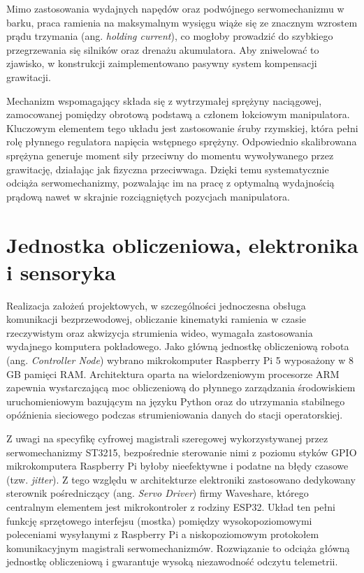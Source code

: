 \documentclass[11pt]{extreport}
\begin{document}
Mimo zastosowania wydajnych napędów oraz podwójnego serwomechanizmu w barku, praca ramienia na maksymalnym wysięgu wiąże się ze znacznym wzrostem prądu trzymania (ang. \textit{holding current}), co mogłoby prowadzić do szybkiego przegrzewania się silników oraz drenażu akumulatora. Aby zniwelować to zjawisko, w konstrukcji zaimplementowano pasywny system kompensacji grawitacji. 

Mechanizm wspomagający składa się z wytrzymałej sprężyny naciągowej, zamocowanej pomiędzy obrotową podstawą a członem łokciowym manipulatora. Kluczowym elementem tego układu jest zastosowanie śruby rzymskiej, która pełni rolę płynnego regulatora napięcia wstępnego sprężyny. Odpowiednio skalibrowana sprężyna generuje moment siły przeciwny do momentu wywoływanego przez grawitację, działając jak fizyczna przeciwwaga. Dzięki temu systematycznie odciąża serwomechanizmy, pozwalając im na pracę z optymalną wydajnością prądową nawet w skrajnie rozciągniętych pozycjach manipulatora.

\section{Jednostka obliczeniowa, elektronika i sensoryka}

Realizacja założeń projektowych, w szczególności jednoczesna obsługa komunikacji bezprzewodowej, obliczanie kinematyki ramienia w czasie rzeczywistym oraz akwizycja strumienia wideo, wymagała zastosowania wydajnego komputera pokładowego. Jako główną jednostkę obliczeniową robota (ang. \textit{Controller Node}) wybrano mikrokomputer Raspberry Pi 5 wyposażony w 8 GB pamięci RAM. Architektura oparta na wielordzeniowym procesorze ARM zapewnia wystarczającą moc obliczeniową do płynnego zarządzania środowiskiem uruchomieniowym bazującym na języku Python oraz do utrzymania stabilnego opóźnienia sieciowego podczas strumieniowania danych do stacji operatorskiej.

Z uwagi na specyfikę cyfrowej magistrali szeregowej wykorzystywanej przez serwomechanizmy ST3215, bezpośrednie sterowanie nimi z poziomu styków GPIO mikrokomputera Raspberry Pi byłoby nieefektywne i podatne na błędy czasowe (tzw. \textit{jitter}). Z tego względu w architekturze elektroniki zastosowano dedykowany sterownik pośredniczący (ang. \textit{Servo Driver}) firmy Waveshare, którego centralnym elementem jest mikrokontroler z rodziny ESP32. Układ ten pełni funkcję sprzętowego interfejsu (mostka) pomiędzy wysokopoziomowymi poleceniami wysyłanymi z Raspberry Pi a niskopoziomowym protokołem komunikacyjnym magistrali serwomechanizmów. Rozwiązanie to odciąża główną jednostkę obliczeniową i gwarantuje wysoką niezawodność odczytu telemetrii.
\end{document}
